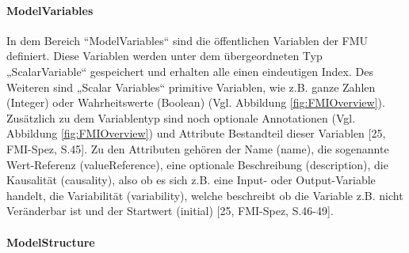 %
%
%
%
\paragraph{ModelVariables}\label{sec:6}
\noindent In dem Bereich “ModelVariables“ sind die öffentlichen Variablen der FMU definiert. Diese Variablen werden unter dem übergeordneten Typ „ScalarVariable“ gespeichert und erhalten alle einen eindeutigen Index. Des Weiteren sind „Scalar Variables“ primitive Variablen, wie z.B. ganze Zahlen (Integer) oder Wahrheitswerte (Boolean) (Vgl. Abbildung \ref{fig:FMIOverview}). Zusätzlich zu dem Variablentyp sind noch optionale Annotationen (Vgl. Abbildung \ref{fig:FMIOverview}) und Attribute Bestandteil dieser Variablen [25, FMI-Spez, S.45]. Zu den Attributen gehören der Name (name), die sogenannte Wert-Referenz (valueReference), eine optionale Beschreibung (description), die Kausalität (causality), also ob es sich z.B. eine Input- oder Output-Variable handelt, die Variabilität (variability), welche beschreibt ob die Variable z.B. nicht Veränderbar ist und der Startwert (initial) [25, FMI-Spez, S.46-49].

\paragraph{ModelStructure}\label{sec:7}

